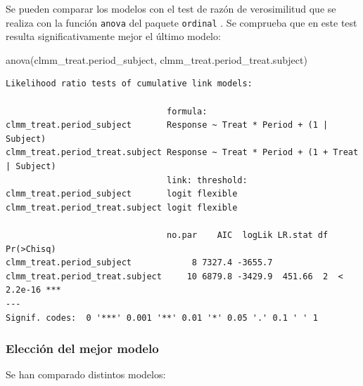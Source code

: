 \documentclass[
  12pt,
  a4paper,
  extrafontsizes,
  onecolumn,
  openright,
  table]{memoir}
\newenvironment{Shaded}{\begin{snugshade}}{\end{snugshade}}
\newcommand{\FunctionTok}[1]{\textcolor[rgb]{0.28,0.35,0.67}{#1}}
\newcommand{\NormalTok}[1]{\textcolor[rgb]{0.00,0.23,0.31}{#1}}
\begin{document}
Se pueden comparar los modelos con el test de razón de verosimilitud que
se realiza con la función \texttt{anova} del paquete \texttt{ordinal}
\autocite[ver][]{ordinal}. Se comprueba que en este test resulta
significativamente mejor el último modelo:

\scriptsize

\begin{Shaded}
\begin{Highlighting}[]
\FunctionTok{anova}\NormalTok{(clmm\_treat.period\_subject, clmm\_treat.period\_treat.subject)}
\end{Highlighting}
\end{Shaded}

\begin{verbatim}
Likelihood ratio tests of cumulative link models:
 
                                formula:                                         
clmm_treat.period_subject       Response ~ Treat * Period + (1 | Subject)        
clmm_treat.period_treat.subject Response ~ Treat * Period + (1 + Treat | Subject)
                                link: threshold:
clmm_treat.period_subject       logit flexible  
clmm_treat.period_treat.subject logit flexible  

                                no.par    AIC  logLik LR.stat df Pr(>Chisq)    
clmm_treat.period_subject            8 7327.4 -3655.7                          
clmm_treat.period_treat.subject     10 6879.8 -3429.9  451.66  2  < 2.2e-16 ***
---
Signif. codes:  0 '***' 0.001 '**' 0.01 '*' 0.05 '.' 0.1 ' ' 1
\end{verbatim}

\normalsize

\hypertarget{elecciuxf3n-del-mejor-modelo}{%
\subsubsection{Elección del mejor
modelo}\label{elecciuxf3n-del-mejor-modelo}}

Se han comparado distintos modelos:
\end{document}
